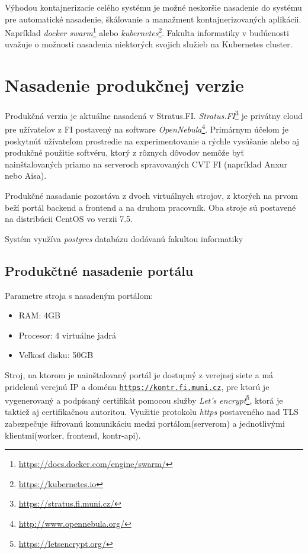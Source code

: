 \documentclass[
  digital, %
  twoside, %
  table,   %
  lof,     %
  lot,     %
]{fithesis3}
\begin{document}
Výhodou kontajnerizacie celého systému je možné neskoršie nasadenie do systému pre automatické nasadenie, škáľovanie a manažment kontajnerizovaných aplikácii. Napríklad \emph{docker swarm}\footnote{\url{https://docs.docker.com/engine/swarm/}} alebo \emph{kubernetes}\footnote{\url{https://kubernetes.io}}. Fakulta informatiky v budúcnosti uvažuje o možnosti nasadenia niektorých svojich služieb na Kubernetes cluster.


\section{Nasadenie produkčnej verzie}

Produkčná verzia je aktuálne nasadená v Stratus.FI. \emph{Stratus.FI}\footnote{\url{https://stratus.fi.muni.cz/}} je privátny cloud pre užívateľov z FI postavený na software \emph{OpenNebula}\footnote{\url{http://www.opennebula.org/}}.
Primárnym účelom je poskytnúť užívateľom prostredie na experimentovanie a rýchle vysúšanie alebo aj produkčné použitie softvéru, ktorý z rôznych dôvodov nemôže byť nainštalovaných priamo na serveroch spravovaných CVT FI (napríklad Anxur nebo Aisa)\cite{fi-tech-stratus}.

Produkčné nasadanie pozostáva z dvoch virtuálnych strojov, z ktorých na prvom beží portál backend a frontend a na druhom pracovník. Oba stroje sú postavené na distribúcii CentOS vo verzii 7.5.

Systém využíva \emph{postgres} databázu dodávanú fakultou informatiky

\subsection{Produkčtné nasadenie portálu}

Parametre stroja s nasadeným portálom:
\begin{itemize}
    \item RAM: 4GB
    \item Procesor: 4 virtuálne jadrá
    \item Veľkosť disku: 50GB
\end{itemize}

Stroj, na ktorom je nainštalovaný portál je dostupný z verejnej siete a má pridelenú verejnú IP a doménu \texttt{\url{https://kontr.fi.muni.cz}}, pre ktorú je vygenerovaný a podpísaný certifikát pomocou služby \emph{Let's encrypt}\footnote{\url{https://letsencrypt.org/}}, ktorá je taktiež aj certifikačnou autoritou. Využitie protokolu \emph{https}\cite{RFC2818} postaveného nad TLS\cite{RFC8446} zabezpečuje šifrovanú komunikáciu medzi portálom(serverom) a jednotlivými klientmi(worker, frontend, kontr-api).
\end{document}

